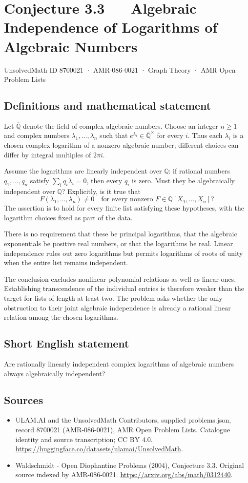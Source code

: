 \documentclass[11pt,a4paper]{article}
\begin{document}
\section*{Conjecture 3.3 — Algebraic Independence of Logarithms of Algebraic Numbers}\label{8700021}
{\small UnsolvedMath ID 8700021 · AMR-086-0021 · Graph Theory · AMR Open Problem Lists}
\subsection{Definitions and mathematical statement}
Let $\overline{\mathbb Q}$ denote the field of complex algebraic numbers. Choose an integer $n\ge1$ and complex numbers $\lambda_1,\ldots,\lambda_n$ such that $e^{\lambda_i}\in\overline{\mathbb Q}^{\times}$ for every $i$. Thus each $\lambda_i$ is a chosen complex logarithm of a nonzero algebraic number; different choices can differ by integral multiples of $2\pi i$.

Assume the logarithms are linearly independent over $\mathbb Q$: if rational numbers $q_1,\ldots,q_n$ satisfy $\sum_i q_i\lambda_i=0$, then every $q_i$ is zero. Must they be algebraically independent over $\mathbb Q$? Explicitly, is it true that
\[
F(\lambda_1,\ldots,\lambda_n)\ne0
\quad\text{for every nonzero }F\in\mathbb Q[X_1,\ldots,X_n]?
\]
The assertion is to hold for every finite list satisfying these hypotheses, with the logarithm choices fixed as part of the data.

There is no requirement that these be principal logarithms, that the algebraic exponentials be positive real numbers, or that the logarithms be real. Linear independence rules out zero logarithms but permits logarithms of roots of unity when the entire list remains independent.

The conclusion excludes nonlinear polynomial relations as well as linear ones. Establishing transcendence of the individual entries is therefore weaker than the target for lists of length at least two. The problem asks whether the only obstruction to their joint algebraic independence is already a rational linear relation among the chosen logarithms.
\subsection{Short English statement}
Are rationally linearly independent complex logarithms of algebraic numbers always algebraically independent?
\subsection{Sources}
\begin{itemize}
\item[S1] ULAM.AI and the UnsolvedMath Contributors, supplied problems.json, record 8700021 (AMR-086-0021), AMR Open Problem Lists. Catalogue identity and source transcription; CC BY 4.0.
\url{https://huggingface.co/datasets/ulamai/UnsolvedMath}.
\item[S2] Waldschmidt - Open Diophantine Problems (2004), Conjecture 3.3. Original source indexed by AMR-086-0021.
\url{https://arxiv.org/abs/math/0312440}.
\end{itemize}
\end{document}
